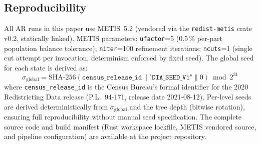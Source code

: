 \subsection{Reproducibility}
\label{sec:methodology:reproducibility}

All AR runs in this paper use METIS~5.2 (vendored via the \texttt{redist-metis}
crate v0.2, statically linked).
METIS parameters: \texttt{ufactor}=5 (0.5\,\% per-part population balance
tolerance); \texttt{niter}=100 refinement iterations; \texttt{ncuts}=1
(single cut attempt per invocation, determinism enforced by fixed seed).
The global seed for each state is derived as:
\[
  \sigma_{\text{global}} = \mathrm{SHA\text{-}256}(\texttt{census\_release\_id}
    \mathbin{\|} \texttt{"DIA\_SEED\_V1"} \mathbin{\|} 0) \bmod 2^{31}
\]
where \texttt{census\_release\_id} is the Census Bureau's formal identifier for
the 2020 Redistricting Data release (P.L.~94-171, release date 2021-08-12).
Per-level seeds are derived deterministically from $\sigma_{\text{global}}$ and
the tree depth (bitwise rotation), ensuring full reproducibility without manual
seed specification.
The complete source code and build manifest (Rust workspace lockfile, METIS
vendored source, and pipeline configuration) are available at the project
repository.
